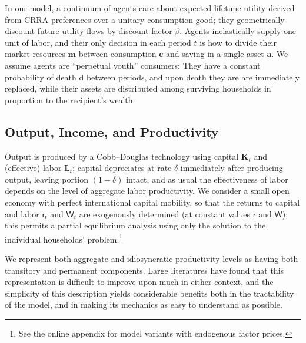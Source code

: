 \documentclass[titlepage]{./econtex}
\begin{document}
In our model, a continuum of agents care about expected lifetime utility derived from CRRA preferences over a unitary consumption good; they geometrically discount future utility flows by discount factor $\beta$.  Agents inelastically supply one unit of labor, and their only decision in each period $t$ is how to divide their market resources $\mathbf{m}$ between consumption $\mathbf{c}$ and saving in a single asset $\mathbf{a}$.  We assume agents are \cite{blanchardFinite} ``perpetual youth'' consumers: They have a constant probability of death $\mathrm{d}$ between periods, and upon death they are are immediately replaced, while their assets are distributed among surviving households in proportion to the recipient's wealth.

\subsection{Output, Income, and Productivity}

Output is produced by a Cobb--Douglas technology using capital $\mathbf{K}_t$ and (effective) labor $\mathbf{L}_t$; capital depreciates at rate $\delta$ immediately after producing output, leaving portion $(1-\delta)$ intact, and as usual the effectiveness of labor depends on the level of aggregate labor productivity.  We consider a small open economy with perfect international capital mobility, so that the returns to capital and labor $\mathsf{r}_t$ and $\mathsf{W}_t$ are exogenously determined (at constant values $\mathsf{r}$ and $\mathsf{W}$); this permits a partial equilibrium analysis using only the solution to the individual households' problem.\footnote{See the online appendix for model variants with endogenous factor prices.}

We represent both aggregate and idiosyncratic productivity levels as having both transitory and permanent components.  Large literatures have found that this representation is difficult to improve upon much in either context, and the simplicity of this description yields considerable benefits both in the tractability of the model, and in making its mechanics as easy to understand as possible.
\end{document}
